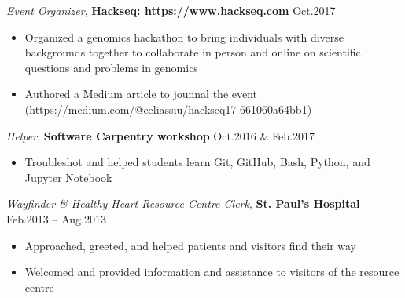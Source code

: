 \documentclass{res}
\renewcommand{\section}[1]{%
  \vspace{0.3in}%
  \centerline{\uppercase{\bf{#1}}}%
  \vspace{-6pt}}
\newcommand{\linevolunteer}[3]{%
  {\sl #3}, {\bf #2} \hfill #1}%
\begin{document}
\begin{resume}
\linevolunteer{Oct.2017}{%
  Hackseq: https://www.hackseq.com}{%
  Event Organizer}
\begin{itemize}
  \item Organized a genomics hackathon to bring individuals with diverse backgrounds together to collaborate in person and online on scientific questions and problems in genomics
  \item Authored a Medium article to jounnal the event (https://medium.com/@celiassiu/hackseq17-661060a64bb1)
\end{itemize}

\linevolunteer{Oct.2016 \& Feb.2017}{%
  Software Carpentry workshop}{%
  Helper}
\begin{itemize}
  \item Troubleshot and helped students learn Git, GitHub, Bash, Python, and Jupyter Notebook
\end{itemize}

\linevolunteer{Feb.2013 -- Aug.2013}{%
  St. Paul's Hospital}{%
  Wayfinder \& Healthy Heart Resource Centre Clerk}
\begin{itemize}
  \item Approached, greeted, and helped patients and visitors find their way
  \item Welcomed and provided information and assistance to visitors of the resource centre
\end{itemize}


\end{resume}
\end{document}
